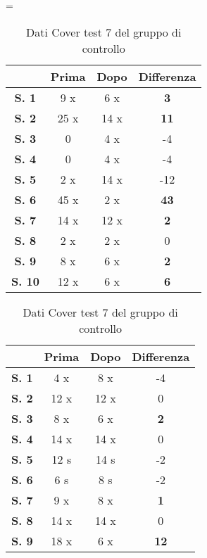 \begin{table}[H]
\centering
\setlength\tabcolsep{4pt}
\begin{minipage}{0.48\textwidth}
\centering
\tablewidth=\textwidth

\begin{tabular}{|c|c|c|c|} \hline
{\textbf{}} & {\textbf{Prima}} & {\textbf{Dopo}}& {\textbf{Differenza}} \\ \hline
\textbf{S. 1} & 9 x & 6 x & \textbf{3} \\ \hline
\textbf{S. 2} & 25 x & 14 x & \textbf{11} \\ \hline
\textbf{S. 3} & 0 & 4 x & -4 \\ \hline
\textbf{S. 4} & 0 & 4 x & -4 \\ \hline
\textbf{S. 5} & 2 x & 14 x & -12 \\ \hline
\textbf{S. 6} & 45 x & 2 x & \textbf{43} \\ \hline
\textbf{S. 7} & 14 x & 12 x & \textbf{2} \\ \hline
\textbf{S. 8} & 2 x & 2 x & 0 \\ \hline
\textbf{S. 9} & 8 x & 6 x & \textbf{2} \\ \hline
\textbf{S. 10} & 12 x & 6 x & \textbf{6} \\ \hline
\end{tabular} 
\caption{Dati Cover test 7 del gruppo sperimentale}

\label{tab:accuracy} 
\end{minipage}%
\hfill
\begin{minipage}{0.48\textwidth}
\centering

\begin{tabular}{|c|c|c|c|} \hline
{\textbf{}} & {\textbf{Prima}} & {\textbf{Dopo}}& {\textbf{Differenza}} \\ \hline
\textbf{S. 1} & 4 x & 8 x & -4 \\ \hline
\textbf{S. 2} & 12 x & 12 x & 0 \\ \hline
\textbf{S. 3} & 8 x & 6 x & \textbf{2} \\ \hline
\textbf{S. 4} & 14 x & 14 x & 0 \\ \hline
\textbf{S. 5} & 12 s & 14 s & -2 \\ \hline
\textbf{S. 6} & 6 s  & 8 s  & -2 \\ \hline
\textbf{S. 7} & 9 x & 8 x & \textbf{1} \\ \hline
\textbf{S. 8} & 14 x & 14 x & 0 \\ \hline
\textbf{S. 9} & 18 x & 6 x & \textbf{12} \\ \hline
\end{tabular} 
\caption{Dati Cover test 7 del gruppo di controllo}

 \label{tab:ompdiff} 
\end{minipage}
\end{table}
